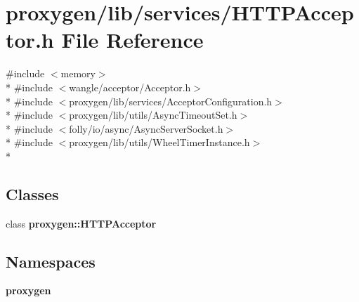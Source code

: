 \section{proxygen/lib/services/\+H\+T\+T\+P\+Acceptor.h File Reference}
\label{HTTPAcceptor_8h}
{\ttfamily \#include $<$memory$>$}\\*
{\ttfamily \#include $<$wangle/acceptor/\+Acceptor.\+h$>$}\\*
{\ttfamily \#include $<$proxygen/lib/services/\+Acceptor\+Configuration.\+h$>$}\\*
{\ttfamily \#include $<$proxygen/lib/utils/\+Async\+Timeout\+Set.\+h$>$}\\*
{\ttfamily \#include $<$folly/io/async/\+Async\+Server\+Socket.\+h$>$}\\*
{\ttfamily \#include $<$proxygen/lib/utils/\+Wheel\+Timer\+Instance.\+h$>$}\\*
\subsection*{Classes}
\begin{DoxyCompactItemize}
\item 
class {\bf proxygen\+::\+H\+T\+T\+P\+Acceptor}
\end{DoxyCompactItemize}
\subsection*{Namespaces}
\begin{DoxyCompactItemize}
\item 
 {\bf proxygen}
\end{DoxyCompactItemize}
